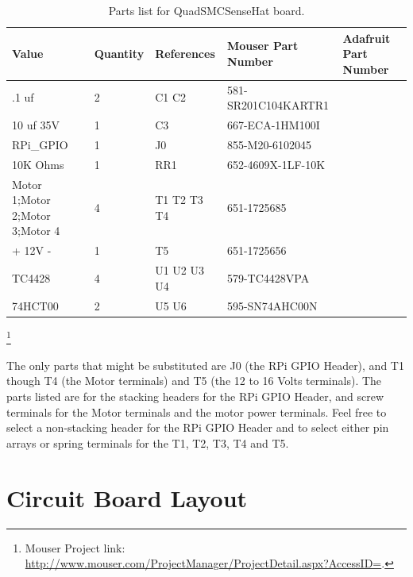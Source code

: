 \begin{table}[htdp]
\begin{centering}\begin{tabular}{|l|l|p{1in}|l|p{.5in}|}
\hline
Value&Quantity&References&Mouser Part Number&Adafruit Part Number \\
\hline
.1 uf&2&C1 C2&581-SR201C104KARTR1& \\
\hline
10 uf 35V&1&C3&667-ECA-1HM100I& \\
\hline
RPi\_GPIO&1&J0&855-M20-6102045& \\
\hline
10K Ohms&1&RR1&652-4609X-1LF-10K& \\
\hline
Motor 1;Motor 2;Motor 3;Motor 4&4&T1 T2 T3 T4&651-1725685& \\
\hline
+ 12V -&1&T5&651-1725656& \\
\hline
TC4428&4&U1 U2 U3 U4&579-TC4428VPA& \\
\hline
74HCT00&2&U5 U6&595-SN74AHC00N& \\
\hline
\end{tabular}
\caption{Parts list for QuadSMCSenseHat board.}
\end{centering}\end{table}\footnote{Mouser Project link: 
\url{http://www.mouser.com/ProjectManager/ProjectDetail.aspx?AccessID=}.}


The only parts that might be substituted are J0 (the RPi GPIO Header), and T1 
though T4 (the Motor terminals) and T5 (the 12 to 16 Volts terminals).  The parts 
listed are for the stacking headers for the RPi GPIO Header, and screw 
terminals for the Motor terminals and the motor power terminals.  Feel free to 
select a non-stacking header for the RPi GPIO Header and to select either pin 
arrays or spring terminals for the T1, T2, T3, T4 and T5.

\section{Circuit Board Layout}

